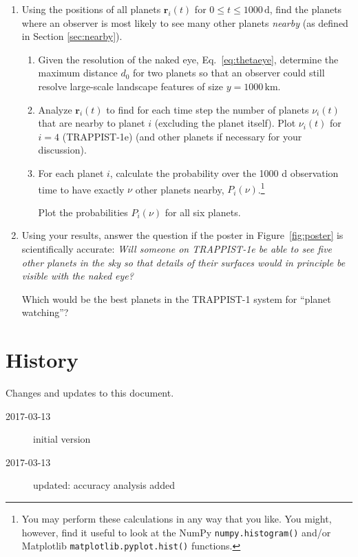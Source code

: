 \documentclass[letterpaper]{scrartcl}
\newenvironment{enuma}{\begin{enumerate}[label=(\alph*)]}{\end{enumerate}}
\newenvironment{enumi}{\begin{enumerate}[label=(\roman*)]}{\end{enumerate}}
\renewcommand{\vec}[1]{\ensuremath{\mathbf{#1}}}
\begin{document}
\begin{enuma}
\begin{enumi}
    the planets). Assume an observer looks side on the system along
    the $y$-direction. Compute a time series of the $y$-component of
    the velocity of the star. Compare the changes to the resolution
    of current Doppler spectrometers (about 1 m/s). Would the wobble
    be detectable?
  \end{enumi}
\item Using the positions of all planets $\vec{r}_{i}(t)$ for $0 \leq
  t \leq 1000\,\text{d}$, find the planets where an observer is most
  likely to see many other planets \emph{nearby} (as defined in Section
  \ref{sec:nearby}).
  \begin{enumi}    
  \item Given the resolution of the naked eye, Eq.~\ref{eq:thetaeye},
    determine the maximum distance $d_{0}$ for two planets so that an
    observer could still resolve large-scale landscape features of
    size $y = 1000\,\text{km}$.
  \item Analyze $\vec{r}_{i}(t)$ to find for each time step the number
    of planets $\nu_{i}(t)$ that are nearby to planet $i$ (excluding
    the planet itself). Plot $\nu_{i}(t)$ for $i=4$ (TRAPPIST-1e) (and
    other planets if necessary for your discussion).
  \item For each planet $i$, calculate the probability over the 1000 d
    observation time to have exactly $\nu$ other planets nearby,
    $P_{i}(\nu)$.\footnote{You may perform these calculations in any
      way that you like. You might, however, find it useful to look at
      the NumPy \texttt{numpy.histogram()} and/or Matplotlib
      \texttt{matplotlib.pyplot.hist()} functions.} 
    
    Plot the probabilities $P_{i}(\nu)$ for all six planets. 
  \end{enumi}
\item Using your results, answer the question if the poster in
  Figure~\ref{fig:poster} is scientifically accurate: \emph{Will
    someone on TRAPPIST-1e be able to see five other planets in the
    sky so that details of their surfaces would in principle be
    visible with the naked eye?}

  Which would be the best planets in the TRAPPIST-1 system for
  ``planet watching''?
\end{enuma}

\section{History}
\label{sec:history}

Changes and updates to this document.
\begin{description}
\item[2017-03-13] initial version
\item[2017-03-13] updated: accuracy analysis added
\end{description}

\end{document}
